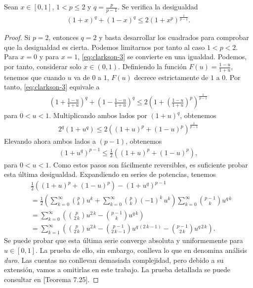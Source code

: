 \begin{lemma} \label{lema:clarkson-3}
    Sean $ x \in [0, 1] $, $ 1 < p \leq 2 $ y $ q = \frac{p}{p-1} $. Se verifica la desigualdad
    \begin{align} \label{eq:clarkson-3}
        (1+x)^q + (1-x)^q \leq 2(1+x^p)^\frac{1}{p-1}.
    \end{align}
\end{lemma}
\begin{proof}
    Si $ p = 2 $, entonces $ q = 2 $ y basta desarrollar los cuadrados para comprobar que la desigualdad es cierta. Podemos limitarnos por tanto al caso $ 1 < p < 2 $. Para $ x = 0 $ y para $ x = 1 $, \eqref{eq:clarkson-3} se convierte en una igualdad. Podemos, por tanto, considerar solo $ x \in (0, 1) $. Definiendo la función $ F(u) = \frac{1 - u}{1 + u} $, tenemos que cuando $ u $ va de $0$ a $1$, $ F(u) $ decrece estrictamente de $1$ a $0$. Por tanto, \eqref{eq:clarkson-3} equivale a
    \begin{align}
        \left(1 + \frac{1 - u}{1 + u}\right)^q + \left(1 - \frac{1 - u}{1 + u}\right)^q \leq 2 \left( 1 + \left( \frac{1 - u}{1 + u} \right)^p \right)^{\frac{1}{p-1}}
    \end{align}
    para $ 0 < u < 1 $. Multiplicando ambos lados por $ (1 + u)^q $, obtenemos
    \begin{align}
        2^q (1 + u^q) \leq 2 \left( (1 + u)^p + (1 - u)^p \right)^{\frac{1}{p-1}}
    \end{align}
    Elevando ahora ambos lados a $ (p - 1) $, obtenemos
    \begin{align}
        (1 + u^q)^{p-1} \leq \frac{1}{2} \left( (1 + u)^p + (1 - u)^p \right),
    \end{align}
    para $ 0 < u < 1 $. Como estos pasos son fácilmente reversibles, es suficiente probar esta última desigualdad. Expandiendo en series de potencias, tenemos
    \begin{align}
        &\frac{1}{2}\left((1+u)^{p}+(1-u)^{p}\right)-(1+u^{q})^{p-1} \\
        &= \frac{1}{2}\left(\sum_{k=0}^{\infty}\binom{p}{k}u^{k}+\sum_{k=0}^{\infty}\binom{p}{k}(-1)^{k}\,u^{k}\right)\sum_{k=0}^{\infty}\binom{p-1}{k}u^{q\,k} \\
        &= \sum_{k=0}^{\infty}\left(\binom{p}{2\,k}u^{2\,k}-\binom{p-1}{k}u^{q\,k}\right) \\
        &= \sum_{k=1}^{\infty}\left(\binom{p}{2\,k}u^{2\,k} - \binom{p-1}{2\,k-1}u^{q\,(2\,k-1)}-\binom{p-1}{2\,k}u^{q\,2\,k}\right).
    \end{align}
    Se puede probar que esta última serie converge absoluta y uniformemente para $ u \in [0, 1] $. La prueba de ello, sin embargo, conlleva lo que en \cite{hewitt} denomina análisis {\it duro}. Las cuentas no conllevan demasiada complejidad, pero debido a su extensión, vamos a omitirlas en este trabajo. La prueba detallada se puede consultar en \cite{hewitt}[Teorema 7.25].
    

\end{proof}
